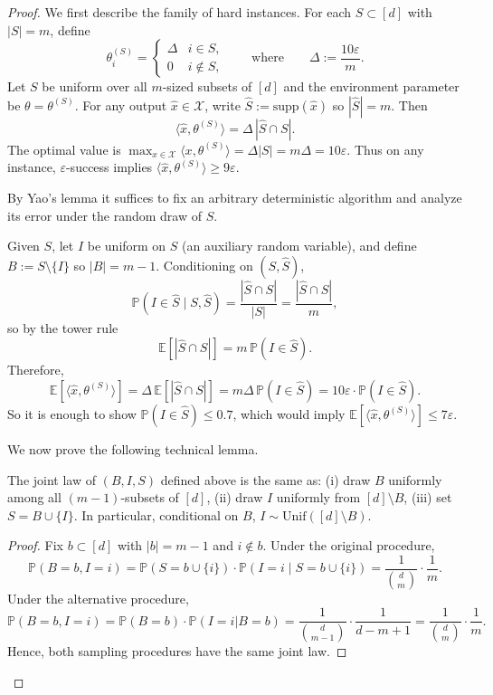 \begin{proof}
We first describe the family of hard instances. For each $S\subset[d]$ with $|S|=m$, define
\[
\theta^{(S)}_i=
\begin{cases}
\Delta & i\in S,\\
0 & i\notin S,
\end{cases}
\qquad\text{where}\qquad \Delta:=\frac{10\varepsilon}{m}.
\]
Let $S$ be uniform over all $m$-sized subsets of $[d]$ and the environment parameter be $\theta=\theta^{(S)}$.
For any output $\hat x\in\mathcal X$, write $\hat S:=\mathrm{supp}(\hat x)$ so $|\hat S|=m$. Then
\[
\langle \hat x,\theta^{(S)}\rangle=\Delta\,|\hat S\cap S|.
\]
The optimal value is $\max_{x\in\mathcal X}\langle x,\theta^{(S)}\rangle=\Delta|S|=m\Delta=10\varepsilon$.
Thus on any instance, $\varepsilon$-success implies $\langle \hat x,\theta^{(S)}\rangle\ge 9\varepsilon$.

By Yao's lemma it suffices to fix an arbitrary deterministic algorithm and analyze its error under the random draw of $S$.

Given $S$, let $I$ be uniform on $S$ (an auxiliary random variable), and define $B:=S\setminus\{I\}$ so $|B|=m-1$.
Conditioning on $(S,\hat S)$,
\[
\mathbb P(I\in \hat S\mid S,\hat S)=\frac{|\hat S\cap S|}{|S|}=\frac{|\hat S\cap S|}{m},
\]
so by the tower rule
\begin{equation}\label{eq:overlap-identity}
\mathbb E[|\hat S\cap S|]=m\,\mathbb P(I\in \hat S).
\end{equation}
Therefore,
\begin{equation}\label{eq:value-vs-I}
\mathbb E[\langle \hat x,\theta^{(S)}\rangle]
=\Delta\,\mathbb E[|\hat S\cap S|]
=m\Delta\,\mathbb P(I\in \hat S)
=10\varepsilon\cdot \mathbb P(I\in \hat S).
\end{equation}
So it is enough to show $\mathbb P(I\in \hat S)\le 0.7$, which would imply
$\mathbb E[\langle \hat x,\theta^{(S)}\rangle]\le 7\varepsilon$.


We now prove the following technical lemma.
\begin{lemma}\label{appendix-lem-equivalent-sampling}
The joint law of $(B,I,S)$ defined above is the same as:
(i) draw $B$ uniformly among all $(m-1)$-subsets of $[d]$,
(ii) draw $I$ uniformly from $[d]\setminus B$,
(iii) set $S=B\cup\{I\}$.
In particular, conditional on $B$, $I\sim \mathrm{Unif}([d]\setminus B)$.
\end{lemma}
\begin{proof}
Fix $b\subset[d]$ with $|b|=m-1$ and $i\notin b$.
Under the original procedure,
\[
\mathbb P(B=b,I=i)
=\mathbb P(S=b\cup\{i\})\cdot \mathbb P(I=i\mid S=b\cup\{i\})
=\frac{1}{\binom{d}{m}}\cdot \frac{1}{m}.
\]
Under the alternative procedure,
\[
\mathbb P(B=b,I=i)
=\mathbb P(B=b)\cdot \mathbb P(I=i|B=b)=\frac{1}{\binom{d}{m-1}}\cdot \frac{1}{d-m+1}=\frac{1}{\binom{d}{m}}\cdot \frac{1}{m}.
\]
Hence, both sampling procedures have the same joint law.
\end{proof}


\end{proof}
